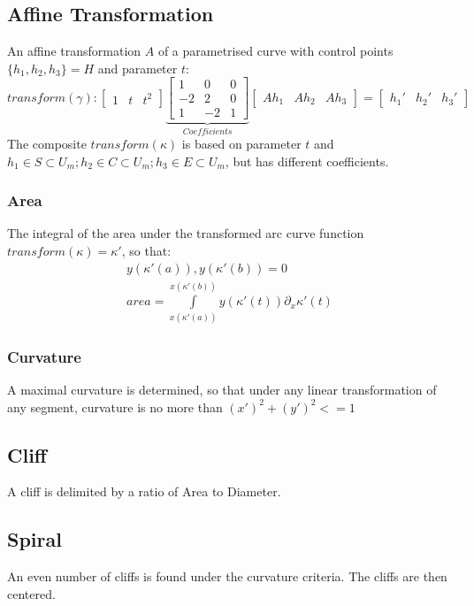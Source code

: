 \documentclass{article}
\begin{document}
\subsection{Affine Transformation}
An affine transformation $A$ of a parametrised curve with control points $\{h_{1},h_{2},h_{3}\} = H$ and parameter $t$:
\begin{equation}
transform(\gamma):
\begin{bmatrix}
1 & t & t^2
\end{bmatrix}
\underbrace{\begin{bmatrix}
1 & 0 & 0\\
-2 & 2 & 0\\
1 & -2 &1
\end{bmatrix}}_{Coefficients}
\begin{bmatrix}
Ah_{1} & Ah_{2} & Ah_{3}
\end{bmatrix}
=
\begin{bmatrix}
h_{1}' & h_{2}' & h_{3}'
\end{bmatrix}
\end{equation}
The composite $transform(\kappa)$ is based on parameter $t$ and $h_{1} \in S \subset U_{m};h_{2} \in C \subset U_{m}; h_{3} \in E \subset U_{m}$, but has different coefficients.

\subsubsection{Area}
The integral of the area under the transformed arc curve function $transform(\kappa) = \kappa'$, so that:
\begin{align}
y(\kappa'(a)), y(\kappa'(b)) = 0\\
area= \int \limits _{x(\kappa'(a))}^{x(\kappa'(b))} y(\kappa'(t))\partial_{x} \kappa'(t)
\end{align}

\subsubsection{Curvature}
A maximal curvature is determined, so that under any linear transformation of any segment, curvature is no more than $(x')^2 + (y')^2 <=1$

\subsection{Cliff}
A cliff is delimited by a ratio of Area to Diameter.

\subsection{Spiral}
An even number of cliffs is found under the curvature criteria.
The cliffs are then centered.


\iffalse
\begin{equation} 
\forall u,v \in V :
d(u,v) = 
\begin{cases}
0,  u=v \\
1,  u \neq v 
\end{cases}
\end{equation}
\fi

\printbibliography
\end{document}

